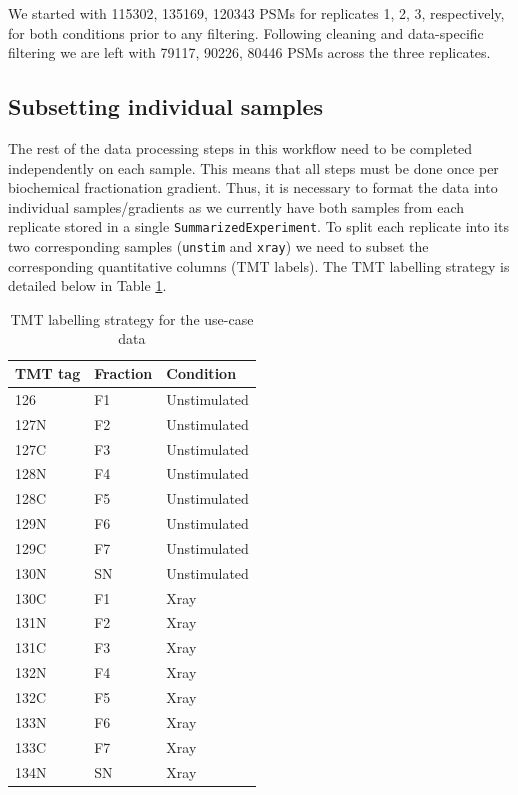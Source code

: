 \documentclass[9pt,a4paper,]{extarticle}
\begin{document}
We started with 115302, 135169, 120343 PSMs
for replicates 1, 2, 3, respectively, for both conditions prior to any filtering.
Following cleaning and data-specific filtering we are left with 79117,
90226, 80446 PSMs across the three replicates.

\subsection{Subsetting individual samples}\label{subsetting-individual-samples}

The rest of the data processing steps in this workflow need to be completed
independently on each sample. This means that all steps must be done once per
biochemical fractionation gradient. Thus, it is necessary to format the data into
individual samples/gradients as we currently have both samples from each replicate
stored in a single \texttt{SummarizedExperiment}. To split each replicate into its two
corresponding samples (\texttt{unstim} and \texttt{xray}) we need to subset the corresponding
quantitative columns (TMT labels). The TMT labelling strategy is detailed below
in Table \ref{tab:tableTMT}.

\begin{table}[H]
\centering
\caption{\label{tab:tableTMT}TMT labelling strategy for the use-case data}
\centering
\begin{tabular}[t]{l|l|l}
\hline
TMT tag & Fraction & Condition\\
\hline
126 & F1 & Unstimulated\\
\hline
127N & F2 & Unstimulated\\
\hline
127C & F3 & Unstimulated\\
\hline
128N & F4 & Unstimulated\\
\hline
128C & F5 & Unstimulated\\
\hline
129N & F6 & Unstimulated\\
\hline
129C & F7 & Unstimulated\\
\hline
130N & SN & Unstimulated\\
\hline
130C & F1 & Xray\\
\hline
131N & F2 & Xray\\
\hline
131C & F3 & Xray\\
\hline
132N & F4 & Xray\\
\hline
132C & F5 & Xray\\
\hline
133N & F6 & Xray\\
\hline
133C & F7 & Xray\\
\hline
134N & SN & Xray\\
\hline
\end{tabular}
\end{table}
\end{document}
